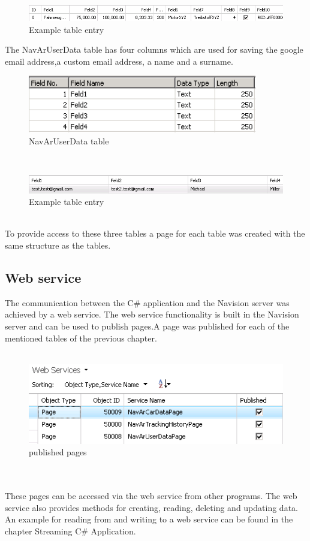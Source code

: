 \begin{figure}[htbp]
\centering
\includegraphics[width=\textwidth,height=\textheight,keepaspectratio]{graphics/cardatatablentry.png}
\caption{Example table entry}
\end{figure}
\newpage
The NavArUserData table has four columns which are used for saving the google email address,a custom email address, a name and a surname.
\\
\begin{figure}[htbp]
\centering
\includegraphics[width=100mm,height=\textheight,keepaspectratio]{graphics/userdatatable.png}
\caption{NavArUserData table }
\end{figure}
\\
\begin{figure}[htbp]
\centering
\includegraphics[width=\textwidth,height=\textheight,keepaspectratio]{graphics/userdatatableentry.png}
\caption{Example table entry}
\end{figure}
\\
To provide access to these three tables a page for each table was created with the same structure as the tables.  
\newpage
\subsection{Web service}
The communication between the C\# application and the Navision server was achieved by a web service. The web service functionality is built in the Navision server and can be used to publish pages.A page was published for each of the mentioned tables of the previous chapter. 
\\\\
\begin{figure}[htbp]
\centering
\includegraphics[width=\textwidth,height=\textheight,keepaspectratio]{graphics/webservice.png}
\caption{published pages}
\end{figure}
\\\\
These pages can be accessed via the web service from other programs. The web service also provides methods for creating, reading, deleting and updating data.
An example for reading from and writing to a web service can be found in the chapter Streaming C\# Application.   
\newpage
